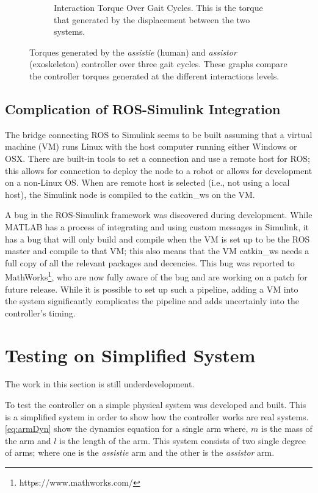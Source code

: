 \begin{figure}
\begin{subfigure}{0.8\linewidth}
        \caption[Interaction Torque Over Gait Cycles]{Interaction Torque Over Gait Cycles. This is the torque that generated by the displacement between the two systems.}
        \label{fig:InteractionTripleGaitInteration}
    \end{subfigure}
    \caption{Torques generated by the \textit{assistie} (human) and  \textit{assistor} (exoskeleton) controller over three gait cycles. These graphs compare the controller torques generated at the different interactions levels. }
    \label{fig:TorqueOverGaitCycles}
\end{figure}




\subsection{Complication of ROS-Simulink Integration}

The bridge connecting ROS to Simulink seems to be built assuming that a virtual machine (VM) runs Linux with the host computer running either Windows or OSX. There are built-in tools to set a connection and use a remote host for ROS; this allows for connection to deploy the node to a robot or allows for development on a non-Linux OS. When are remote host is selected (i.e., not using a local host), the Simulink node is compiled to the catkin\_ws on the VM. 

A bug in the ROS-Simulink framework was discovered during development. While MATLAB has a process of integrating and using custom messages in Simulink, it has a bug that will only build and compile when the VM is set up to be the ROS master and compile to that VM; this also means that the VM catkin\_ws needs a full copy of all the relevant packages and decencies. This bug was reported to MathWorks\footnote{https://www.mathworks.com/}, who are now fully aware of the bug and are working on a patch for future release. While it is possible to set up such a pipeline, adding a VM into the system significantly complicates the pipeline and adds uncertainly into the controller's timing. 



\section{Testing on Simplified System}

The work in this section is still underdevelopment. 


To test the controller on a simple physical system was developed and built. This is a simplified system in order to show how the controller works are real systems.  \autoref{eq:armDyn} show the dynamics equation for a single arm where, $m$ is the mass of the arm and $l$ is the length of the arm. This system consists of two single degree of arms; where one is the \textit{assistie} arm and the other is the \textit{assistor} arm.

